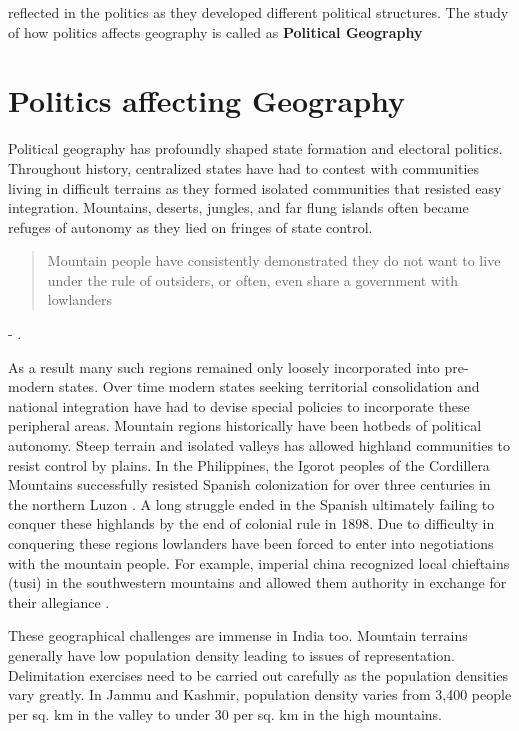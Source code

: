 reflected in the politics as they developed different political structures. The study of how politics affects geography is called as \textbf{Political Geography}

\section{Politics affecting Geography}
Political geography has profoundly shaped state formation and electoral politics. Throughout history, centralized states have had to contest with communities living in difficult terrains as they formed isolated communities that resisted easy integration. Mountains, deserts, jungles, and far flung islands often became refuges of autonomy  as they lied on fringes of state control. \begin{quote} Mountain people have consistently demonstrated they do not want to live under the rule of outsiders, or often, even share a government with lowlanders\end{quote} 

\hspace*{\fill} - \cite{Hammes2017}. 

As a result many such regions remained only loosely incorporated into pre-modern states. Over time modern states seeking territorial consolidation and national integration have had to devise special policies to incorporate these peripheral areas. Mountain regions historically have been hotbeds of political autonomy. Steep terrain and isolated valleys has allowed highland communities to  resist control by plains. In the Philippines, the Igorot peoples of the Cordillera Mountains successfully resisted Spanish colonization for over three centuries in the northern Luzon \citep{scott1970igorot}. A long struggle ended in the Spanish ultimately failing to conquer these highlands by the end of colonial rule in 1898. Due to difficulty in conquering these regions lowlanders have been forced to enter into negotiations with the mountain people. For example, imperial china  recognized local chieftains (tusi) in the southwestern mountains and allowed them authority in exchange for their allegiance \citep{took2005native}.  

These geographical challenges are immense in India too. Mountain terrains generally have low population density leading to issues of representation. Delimitation exercises need to be carried out carefully as the population densities vary greatly. In Jammu and Kashmir, population density varies from  3,400 people per sq. km in the valley to under 30 per sq. km in the high mountains. 

